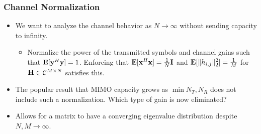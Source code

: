 \documentclass[10pt,tgadventor, onlymath]{beamer}
\begin{document}
\begin{frame}
\frametitle{Channel Normalization}
\begin{itemize}
\item
	We want to analyze the channel behavior as $N \rightarrow \infty$ without sending capacity to infinity. 
\begin{itemize}
\item
	Normalize the power of the transmitted symbols and channel gains such that $\mathop{\bf E{}}[\mathbf{y}^H \mathbf{y} ] = 1$.
	Enforcing that $\mathop{\bf E{}}[\mathbf{x}^H \mathbf{x} ] = \frac{1}{N}\mathbf{I}$ and $\mathop{\bf E{}}[\|h_{i,j}\|^2_2 ]= \frac{1}{M}$ for $\mathbf{H} \in \mathcal{C}^{M \times N} $ satisfies this.
\end{itemize}
\item
	The popular result that MIMO capacity grows as $\min{N_T, N_R}$ does not include such a normalization. Which type of gain is now eliminated?
\item
	Allows for a matrix to have a converging eigenvalue distribution despite $N, M \rightarrow \infty$.
\end{itemize}
\end{frame}
\end{document}
